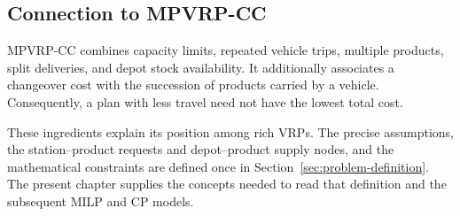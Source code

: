\subsection{Connection to MPVRP-CC}

MPVRP-CC combines capacity limits, repeated vehicle trips, multiple products,
split deliveries, and depot stock availability. It additionally associates a
changeover cost with the succession of products carried by a vehicle.
Consequently, a plan with less travel need not have the lowest total cost.

These ingredients explain its position among rich VRPs. The precise
assumptions, the station--product requests and depot--product supply nodes,
and the mathematical constraints are defined once in
Section~\ref{sec:problem-definition}. The present chapter supplies the concepts
needed to read that definition and the subsequent MILP and CP models.
